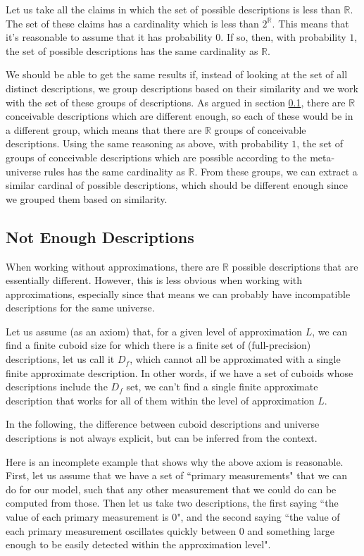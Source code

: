 \documentclass[a4paper
,draft
]{article}
\def\reale{\mathbb{R}}
\newcommand{\ghilimele}[1]{``#1"}
\begin{document}
Let us take all the claims in which the set of possible descriptions
is less than $\reale$.
The set of these claims has a cardinality which is less than $2^\reale$.
This means that it's reasonable to assume that it has probability $0$.
If so, then, with probability $1$, the set of possible descriptions has the same
cardinality as $\reale$.

We should be able to get the same results if, instead of looking at the set
of all distinct descriptions, we group descriptions based on their similarity
and we work with the set of these groups of descriptions.
As argued in section \ref{sec:not-enough-descriptions},
there are $\reale$ conceivable descriptions which are different
enough, so each of these would be in a different group, which means that
there are $\reale$ groups of conceivable descriptions.
Using the same reasoning as above, with probability $1$, the set of groups of
conceivable descriptions which are possible according to the meta-universe
rules has the same cardinality as $\reale$.
From these groups, we can extract a similar cardinal of
possible descriptions, which should be different enough since we grouped them
based on similarity.

\subsection{Not Enough Descriptions}
\label{sec:not-enough-descriptions}

When working without approximations, there are $\reale$ possible descriptions
that are essentially different. However, this is less obvious when working with
approximations, especially since that means we can probably have incompatible
descriptions for the same universe.

Let us assume (as an axiom) that, for a given level of approximation $L$, we can
find a finite cuboid size for which there is a finite set of
(full-precision)
descriptions, let us call it $D_f$, which cannot all be approximated with a
single finite approximate description.
In other words, if we have a set of cuboids whose descriptions include
the $D_f$ set, we can't
find a single finite approximate description that works for all of them
within the level of approximation $L$.

In the following, the difference between
cuboid descriptions and universe descriptions is not always explicit,
but can be inferred from the context.

Here is an incomplete example that shows why the above axiom is reasonable.
First, let us assume that we have a set of
\ghilimele{primary measurements} that we
can do for our model, such that any other measurement that we could do can be
computed from those.
Then let us take two descriptions, the first saying
\ghilimele{the value of each primary measurement is $0$},
and the second saying
\ghilimele{the value of each primary measurement oscillates quickly
  between $0$ and something large enough to be easily detected within
  the approximation level}.
\end{document}
